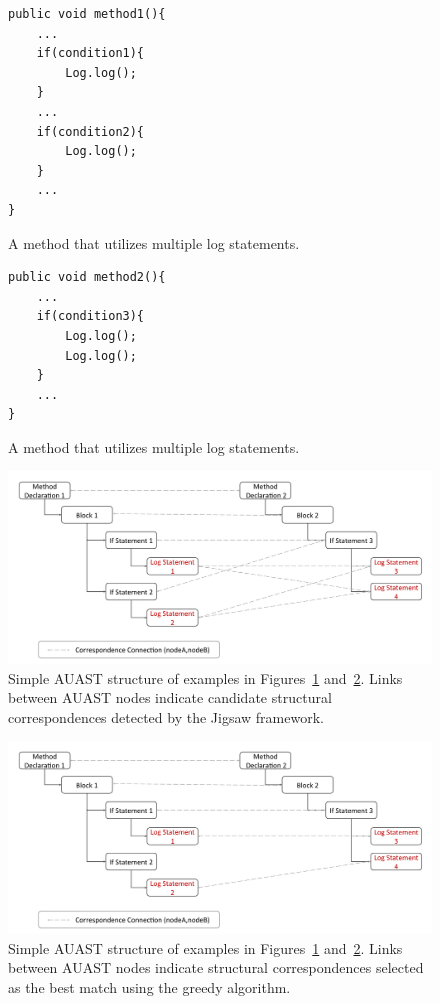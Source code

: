 
\begin{figure}[t]
\def\baselinestretch{1}
\begin{lstlisting}
public void method1(){
	...
	if(condition1){
		Log.log();
	}
	...
	if(condition2){
		Log.log();
	}
	...
}
\end{lstlisting}
\caption{A  method that utilizes multiple log statements.\label{multiple1}}
\end{figure}



\begin{figure}[H]
\def\baselinestretch{1}
\begin{lstlisting}
public void method2(){
	...
	if(condition3){
		Log.log();
		Log.log();
	}
	...
}
\end{lstlisting}
\caption{A  method that utilizes multiple log statements.\label{multiple2}}
\end{figure}

\begin{figure} [H]
  \centering\includegraphics [width = \textwidth]{Drawing4/multipleLogging.pdf}
  \caption{Simple AUAST structure of examples in Figures~\ref{multiple1} and~\ref{multiple2}. Links between AUAST nodes indicate candidate structural correspondences detected by the Jigsaw framework.}
  \label{mast_1}
\end{figure}


\begin{figure} [H]
  \centering\includegraphics [width = \textwidth]{Drawing4/multipleLogging2.pdf}
  \caption{Simple AUAST structure of examples in Figures~\ref{multiple1} and~\ref{multiple2}. Links between AUAST nodes indicate structural correspondences selected as the best match using the greedy algorithm.}
  \label{m_ast2}
\end{figure}


